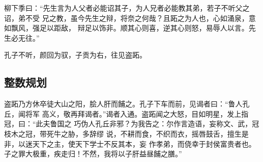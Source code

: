 柳下季曰：“先生言为人父者必能诏其子，为人兄者必能教其弟，若子不听父之诏，弟不受
兄之教，虽今先生之辩，将奈之何哉？且跖之为人也，心如涌泉，意如飘风，强足以距敌，
辩足以饰非。顺其心则喜，逆其心则怒，易辱人以言。先生必无往。”

孔子不听，颜回为驭，子贡为右，往见盗跖。

\subsection{整数规划}
盗跖乃方休卒徒大山之阳，脍人肝而餔之。孔子下车而前，见谒者曰：“鲁人孔丘，闻将军
高义，敬再拜谒者。”谒者入通。盗跖闻之大怒，目如明星，发上指冠，曰：“此夫鲁国之
巧伪人孔丘非邪？为我告之：尔作言造语，妄称文、武，冠枝木之冠，带死牛之胁，多辞缪
说，不耕而食，不织而衣，摇唇鼓舌，擅生是非，以迷天下之主，使天下学士不反其本，妄
作孝弟，而侥幸于封侯富贵者也。子之罪大极重，疾走归！不然，我将以子肝益昼餔之膳。”
